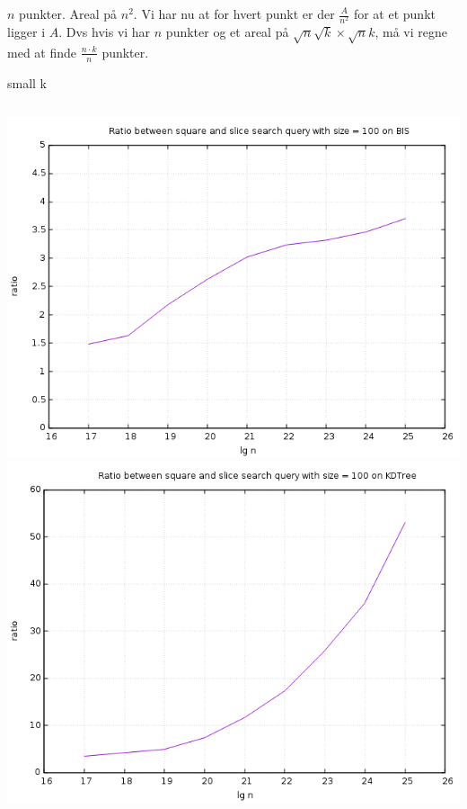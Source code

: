 \documentclass[pdf]{beamer}
\begin{document}
\begin{frame}
  $n$ punkter. Areal på $n^2$. Vi har nu at for hvert punkt er der $\frac{A}{n^2}$ for at et punkt ligger i $A$. Dvs hvis vi har $n$ punkter og et areal på $\sqrt{n}\sqrt{k}\times\sqrt{n}{k}$, må vi regne med at finde $\frac{n\cdot k}{n}$ punkter.
\end{frame}




\begin{frame}{small k}
  \begin{columns}
    \includegraphics[scale=0.32]{pictures/analysis/smalls/bis_ratio_100.png}
    \includegraphics[scale=0.32]{pictures/analysis/smalls/kdtree_ratio_100.png}
  \end{columns}
\end{frame}
\end{document}
